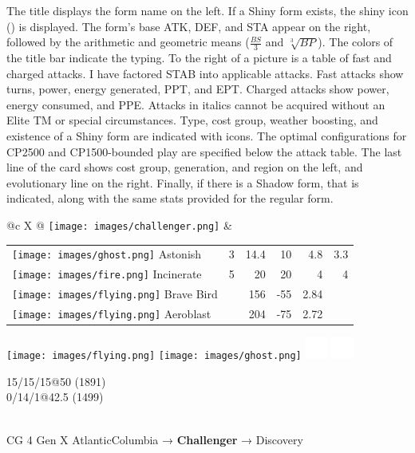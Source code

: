 \documentclass[ebook,10pt,openany,oneside]{memoir}
\newcommand\calign[1]{\raisebox{-0.25\height}{#1}}
\begin{document}
The title displays the form name on the left.
If a Shiny form exists, the shiny icon (\calign{\texttt{[image: images/shiny.png]}}) is displayed.
The form's base ATK, DEF, and STA appear on the right, followed by the arithmetic and geometric means
 ($\frac{BS}{3}$ and $\sqrt[3]{BP}$).
The colors of the title bar indicate the typing.
To the right of a picture is a table of fast and charged attacks.
I have factored STAB into applicable attacks.
Fast attacks show turns, power, energy generated, PPT, and EPT\@.
Charged attacks show power, energy consumed, and PPE\@.
Attacks in italics cannot be acquired without an Elite TM or special circumstances.
Type, cost group, weather boosting, and existence of a Shiny form are indicated with icons.
The optimal configurations for CP2500 and CP1500-bounded play are specified below the attack table.
The last line of the card shows cost group, generation, and region on the left,
 and evolutionary line on the right.
Finally, if there is a Shadow form, that is indicated, along with the same stats
  provided for the regular form.
\vfill
\begin{speciesbox}[title=OV-099 Challenger,title style={left color=Flying,right color=Ghost},after title={\hfill 200 120 100 140.00 133.89}]
\footnotesize
\begin{tabularx}{\linewidth}{@{}c X @{}}
\texttt{[image: images/challenger.png]} &
\begingroup
\setlength{\tabcolsep}{4pt}
\begin{tabular}{lrrrrr}
\texttt{[image: images/ghost.png]} Astonish & 3 & 14.4 & 10 & 4.8 & 3.3 \\
\texttt{[image: images/fire.png]} Incinerate & 5 & 20 & 20 & 4 & 4 \\
\texttt{[image: images/flying.png]} Brave Bird & & 156 & -55 & 2.84 & \\
\texttt{[image: images/flying.png]} Aeroblast & & 204 & -75 & 2.72 & \\
\end{tabular}
\endgroup
\end{tabularx}
\noindent\begin{minipage}{0.3\linewidth}
\texttt{[image: images/flying.png]}
\texttt{[image: images/ghost.png]}
\includegraphics[height=2em,keepaspectratio]{images/windy.png}
\includegraphics[height=2em,keepaspectratio]{images/fog.png}
\end{minipage}
\begin{minipage}{0.7\linewidth}\raggedleft{}
\vfill{}
  15/15/15@50 (1891)\\
  0/14/1@42.5 (1499)
\end{minipage}\\
CG 4 Gen X Atlantic\hfill{}Columbia → \textbf{Challenger} → Discovery
\end{speciesbox}
\end{document}
